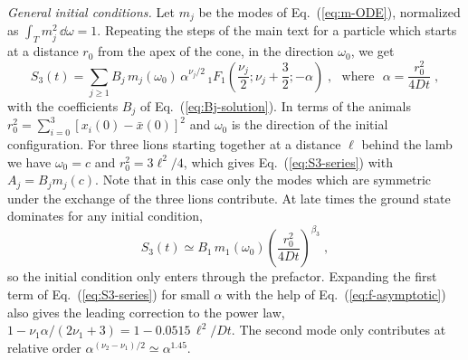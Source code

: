 \emph{General initial conditions.} Let $m_j$ be the modes of Eq.~(\ref{eq:m-ODE}), normalized as $\int_T m_j^2 \, \dd \omega = 1$. Repeating the steps of the main text for a particle which starts at a distance $r_0$ from the apex of the cone, in the direction $\omega_0$, we get \cite{DeB87,BS97}
\begin{equation} \label{S:S-general}
    S_3(t) = \sum_{j \geq 1} B_j \, m_j(\omega_0) \, \alpha^{\nu_j/2} \,_1F_1\left( \frac{\nu_j}{2} ; \nu_j + \frac{3}{2} ; -\alpha \right) \;, \mbox{~~where~~} \alpha = \frac{r_0^2}{4 D t} \;,
\end{equation}
with the coefficients $B_j$ of Eq.~(\ref{eq:Bj-solution}). In terms of the animals $r_0^2 = \sum_{i = 0}^{3} [x_i(0) - \bar{x}(0)]^2$ and $\omega_0$ is the direction of the initial configuration. For three lions starting together at a distance $\ell$ behind the lamb we have $\omega_0 = c$ and $r_0^2 = 3 \ell^2/4$, which gives Eq.~(\ref{eq:S3-series}) with $A_j = B_j m_j(c)$. Note that in this case only the modes which are symmetric under the exchange of the three lions contribute. At late times the ground state dominates for any initial condition,
\begin{equation} \label{S:S-late}
    S_3(t) \simeq B_1 \, m_1(\omega_0) \left( \frac{r_0^2}{4 D t} \right)^{\beta_3} \;,
\end{equation}
so the initial condition only enters through the prefactor. Expanding the first term of Eq.~(\ref{eq:S3-series}) for small $\alpha$ with the help of Eq.~(\ref{eq:f-asymptotic}) also gives the leading correction to the power law, $1 - \nu_1 \alpha/(2 \nu_1 + 3) = 1 - 0.0515 \, \ell^2/Dt$. The second mode only contributes at relative order $\alpha^{(\nu_2 - \nu_1)/2} \simeq \alpha^{1.45}$.

